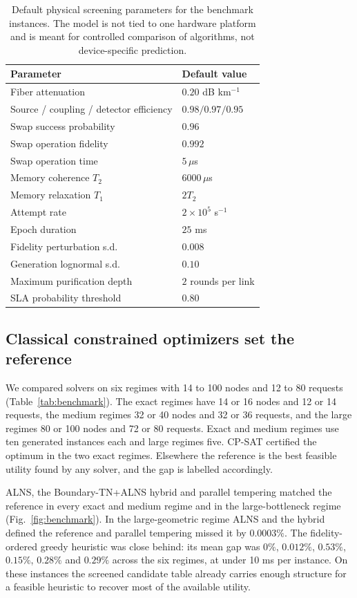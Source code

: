 \documentclass[pdflatex,sn-nature]{sn-jnl}
\theoremstyle{plain}
\theoremstyle{remark}
\begin{document}
\begin{table}[t]
\caption{Default physical screening parameters for the benchmark instances. The model is not tied to one hardware platform and is meant for controlled comparison of algorithms, not device-specific prediction.}\label{tab:physics}
\centering
\small
\begin{tabular}{@{}ll@{}}
\toprule
Parameter & Default value\\
\midrule
Fiber attenuation & $0.20$ dB km$^{-1}$\\
Source / coupling / detector efficiency & $0.98 / 0.97 / 0.95$\\
Swap success probability & $0.96$\\
Swap operation fidelity & $0.992$\\
Swap operation time & $5\,\mu$s\\
Memory coherence $T_2$ & $6000\,\mu$s\\
Memory relaxation $T_1$ & $2T_2$\\
Attempt rate & $2\times10^5$ s$^{-1}$\\
Epoch duration & $25$ ms\\
Fidelity perturbation s.d. & $0.008$\\
Generation lognormal s.d. & $0.10$\\
Maximum purification depth & $2$ rounds per link\\
SLA probability threshold & $0.80$\\
\bottomrule
\end{tabular}
\end{table}

\subsection{Classical constrained optimizers set the reference}

We compared solvers on six regimes with 14 to 100 nodes and 12 to 80 requests (Table~\ref{tab:benchmark}). The exact regimes have 14 or 16 nodes and 12 or 14 requests, the medium regimes 32 or 40 nodes and 32 or 36 requests, and the large regimes 80 or 100 nodes and 72 or 80 requests. Exact and medium regimes use ten generated instances each and large regimes five. CP-SAT certified the optimum in the two exact regimes. Elsewhere the reference is the best feasible utility found by any solver, and the gap is labelled accordingly.

ALNS, the Boundary-TN+ALNS hybrid and parallel tempering matched the reference in every exact and medium regime and in the large-bottleneck regime (Fig.~\ref{fig:benchmark}). In the large-geometric regime ALNS and the hybrid defined the reference and parallel tempering missed it by $0.0003\%$. The fidelity-ordered greedy heuristic was close behind: its mean gap was $0\%$, $0.012\%$, $0.53\%$, $0.15\%$, $0.28\%$ and $0.29\%$ across the six regimes, at under 10 ms per instance. On these instances the screened candidate table already carries enough structure for a feasible heuristic to recover most of the available utility.
\end{document}

